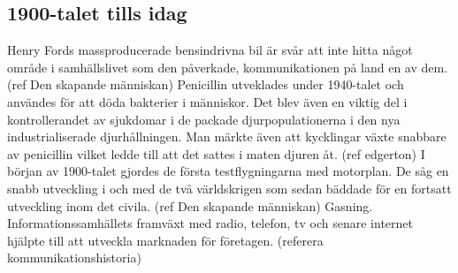 \subsection{1900-talet tills idag}
Henry Fords massproducerade bensindrivna bil är svår att inte hitta något område i samhällslivet som den påverkade, kommunikationen på land en av dem. (ref Den skapande människan) 
\newline
\newline
Penicillin utveklades under 1940-talet och användes för att döda bakterier i människor. Det blev även en viktig del i kontrollerandet av sjukdomar i de packade djurpopulationerna i den nya industrialiserade djurhållningen. Man märkte även att kycklingar växte snabbare av penicillin vilket ledde till att det sattes i maten djuren åt. (ref edgerton) 
\newline
\newline
I början av 1900-talet gjordes de första testflygningarna med motorplan. De såg en snabb utveckling i och med de två världskrigen som sedan bäddade för en fortsatt utveckling inom det civila. (ref Den skapande människan) 
\newline
\newline
Gasning. 
\newline
\newline
Informationssamhällets framväxt med radio, telefon, tv och senare internet hjälpte till att utveckla marknaden för företagen. (referera kommunikationshistoria)